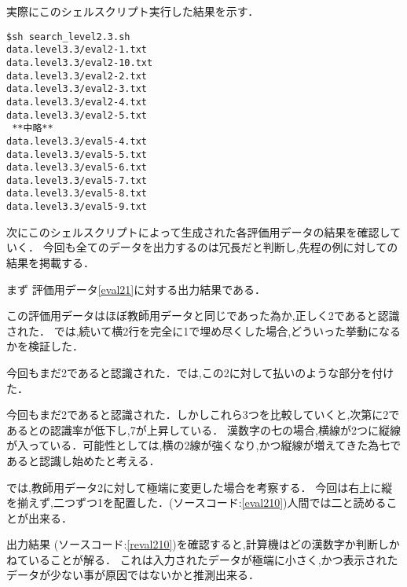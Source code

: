実際にこのシェルスクリプト実行した結果を示す．

\begin{oframed}
    \begin{verbatim}
$sh search_level2.3.sh
data.level3.3/eval2-1.txt
data.level3.3/eval2-10.txt
data.level3.3/eval2-2.txt
data.level3.3/eval2-3.txt
data.level3.3/eval2-4.txt
data.level3.3/eval2-5.txt
 **中略**
data.level3.3/eval5-4.txt
data.level3.3/eval5-5.txt
data.level3.3/eval5-6.txt
data.level3.3/eval5-7.txt
data.level3.3/eval5-8.txt
data.level3.3/eval5-9.txt\end{verbatim}
\end{oframed}

次にこのシェルスクリプトによって生成された各評価用データの結果を確認していく．
今回も全てのデータを出力するのは冗長だと判断し,先程の例に対しての結果を掲載する．

まず 評価用データ\ref{eval21}に対する出力結果である．



この評価用データはほぼ教師用データと同じであった為か,正しく2であると認識された．
では,続いて横2行を完全に1で埋め尽くした場合,どういった挙動になるかを検証した．



今回もまだ2であると認識された．では,この2に対して払いのような部分を付けた．


今回もまだ2であると認識された．しかしこれら3つを比較していくと,次第に2であるとの認識率が低下し,7が上昇している．
漢数字の七の場合,横線が2つに縦線が入っている．可能性としては,横の2線が強くなり,かつ縦線が増えてきた為七であると認識し始めたと考える．

では,教師用データ2に対して極端に変更した場合を考察する．
今回は右上に縦を揃えず,二つずつ1を配置した．(ソースコード:\ref{eval210})人間では二と読めることが出来る．




出力結果 (ソースコード:\ref{reval210})を確認すると,計算機はどの漢数字か判断しかねていることが解る．
これは入力されたデータが極端に小さく,かつ表示されたデータが少ない事が原因ではないかと推測出来る．


